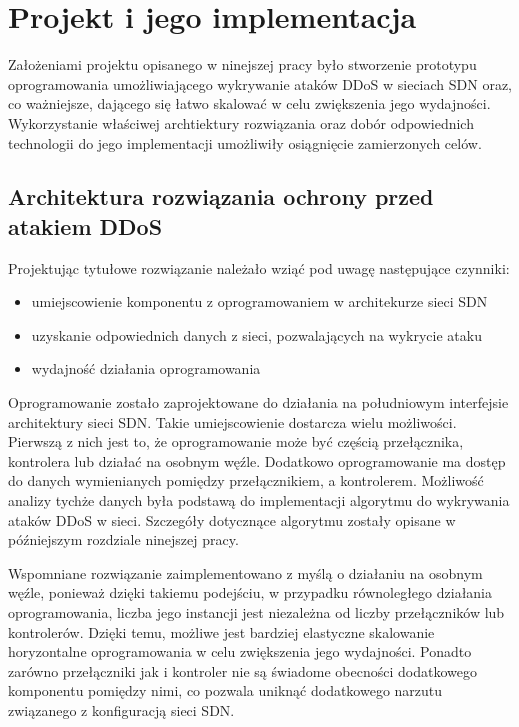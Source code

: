 \chapter{Projekt i jego implementacja}

Założeniami projektu opisanego w ninejszej pracy było stworzenie prototypu
oprogramowania umożliwiającego wykrywanie ataków DDoS w sieciach SDN oraz, co
ważniejsze, dającego się łatwo skalować w celu zwiększenia jego wydajności.
Wykorzystanie właściwej archtiektury rozwiązania oraz dobór odpowiednich
technologii do jego implementacji umożliwiły osiągnięcie zamierzonych celów.

\section{Architektura rozwiązania ochrony przed atakiem DDoS}

Projektując tytułowe rozwiązanie należało wziąć pod uwagę następujące czynniki:
\begin{itemize}
  \item umiejscowienie komponentu z oprogramowaniem w architekurze sieci SDN
  \item uzyskanie odpowiednich danych z sieci, pozwalających na wykrycie ataku
  \item wydajność działania oprogramowania
\end{itemize}

Oprogramowanie zostało zaprojektowane do działania na południowym interfejsie
architektury sieci SDN. Takie umiejscowienie dostarcza wielu możliwości.
Pierwszą z nich jest to, że oprogramowanie może być częścią przełącznika,
kontrolera lub działać na osobnym węźle. Dodatkowo oprogramowanie ma dostęp do
danych wymienianych pomiędzy przełącznikiem, a kontrolerem. Możliwość analizy
tychże danych była podstawą do implementacji algorytmu do wykrywania ataków DDoS
w sieci. Szczegóły dotycznące algorytmu zostały opisane w późniejszym rozdziale
ninejszej pracy. 

Wspomniane rozwiązanie zaimplementowano z myślą o działaniu na osobnym węźle,
ponieważ dzięki takiemu podejściu, w przypadku równoległego działania
oprogramowania, liczba jego instancji jest niezależna od liczby przełączników
lub kontrolerów. Dzięki temu, możliwe jest bardziej elastyczne skalowanie
horyzontalne oprogramowania w celu zwiększenia jego wydajności. Ponadto zarówno
przełączniki jak i kontroler nie są świadome obecności dodatkowego komponentu
pomiędzy nimi, co pozwala uniknąć dodatkowego narzutu związanego z konfiguracją
sieci SDN. 

